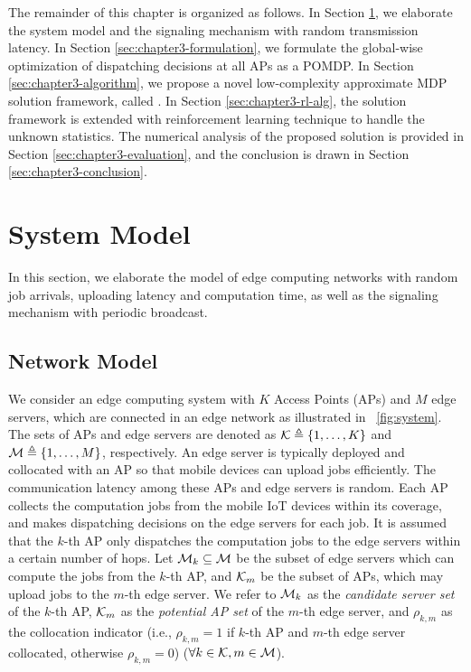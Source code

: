 The remainder of this chapter is organized as follows.
In Section \ref{sec:chapter3-model}, we elaborate the system model and the signaling mechanism with random transmission latency.
In Section \ref{sec:chapter3-formulation}, we formulate the global-wise optimization of dispatching decisions at all APs as a POMDP.
In Section \ref{sec:chapter3-algorithm}, we propose a novel low-complexity approximate MDP solution framework, called {\Dalgname}.
In Section \ref{sec:chapter3-rl-alg}, the solution framework is extended with reinforcement learning technique to handle the unknown statistics.
The numerical analysis of the proposed solution is provided in Section \ref{sec:chapter3-evaluation}, and the conclusion is drawn in Section \ref{sec:chapter3-conclusion}.



\section{System Model}
\label{sec:chapter3-model}
In this section, we elaborate the model of edge computing networks with random job arrivals, uploading latency and computation time, as well as the signaling mechanism with periodic broadcast.
\subsection{Network Model}
We consider an edge computing system with $K$ Access Points (APs) and $M$ edge servers, which are connected in an edge network as illustrated in \figurename~\ref{fig:system}.
The sets of APs and edge servers are denoted as $\mathcal{K} \triangleq \{1,\dots,K\}$ and $\mathcal{M} \triangleq \{1,\dots,M\}$, respectively.
An edge server is typically deployed and collocated with an AP so that mobile devices can upload jobs efficiently.
The communication latency among these APs and edge servers is random.
Each AP collects the computation jobs from the {mobile IoT devices} within its coverage, and makes dispatching {decisions} on the edge servers for each job.
It is assumed that the $k$-th AP only dispatches the computation jobs to the edge servers within a certain number of hops.
Let $\mathcal{M}_{k} \subseteq \mathcal{M}$ be the subset of edge servers which can compute the jobs from the $k$-th AP, and $\mathcal{K}_{m}$ be the subset of APs, which may upload jobs to the $m$-th edge server.
We refer to $\mathcal{M}_{k}$ as the \emph{candidate server set} of the $k$-th AP, $\mathcal{K}_{m}$ as the \emph{potential AP set} of the $m$-th edge server, and $\rho_{k,m}$ as the collocation indicator (i.e., $\rho_{k,m}=1$ if $k$-th AP and $m$-th edge server collocated, otherwise $\rho_{k,m}=0$) ($\forall k\in\mathcal{K}, m\in\mathcal{M}$).

